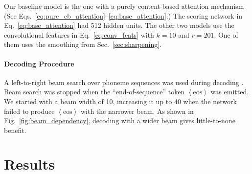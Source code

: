 \documentclass{article} %
\begin{document}




Our baseline model is the one with a purely content-based attention mechanism
(See Eqs.~\eqref{eq:pure_cb_attention}--\eqref{eq:base_attention}.) The scoring
network in Eq.~\eqref{eq:base_attention} had 512 
hidden units.
The other two models use the convolutional features in Eq.~\eqref{eq:conv_feats}
with $k=10$ and $r=201$. One of them uses the smoothing from
Sec.~\ref{sec:sharpening}.

\paragraph{Decoding Procedure}
A left-to-right beam search over phoneme sequences
was used during decoding \cite{sutskever_sequence_2014}. Beam search was stopped
when the ``end-of-sequence'' token $\left<\text{eos}\right>$ was emitted. We
started with a beam width of 10, increasing it up to 40 when the network failed
to produce $\left<\text{eos}\right>$ with the narrower beam.  As shown in
Fig.~\ref{fig:beam_dependency}, decoding with a wider beam gives little-to-none
benefit. 


\section{Results}
\label{sec:results}
\end{document}
